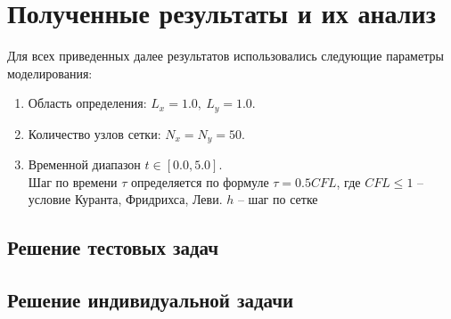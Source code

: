 \documentclass[a4paper,12pt]{article}
\begin{document}
\section{Полученные результаты и их анализ}
\label{sec:normal}
Для всех приведенных далее результатов использовались следующие параметры моделирования:
 \begin{enumerate}
	\item Область определения: $L_x = 1.0, \ L_y = 1.0.$
	\item Количество узлов сетки: $N_x = N_y = 50.$
	\item Временной диапазон $t \in [0.0, 5.0]$.\\ Шаг по времени $\tau$ определяется по формуле $\tau = 0.5 CFL$, где $CFL \leq 1$ -- условие Куранта, Фридрихса, Леви. $h$ -- шаг по сетке
\end{enumerate}
\subsection{Решение тестовых задач}

\subsection{Решение индивидуальной задачи}
\end{document}

